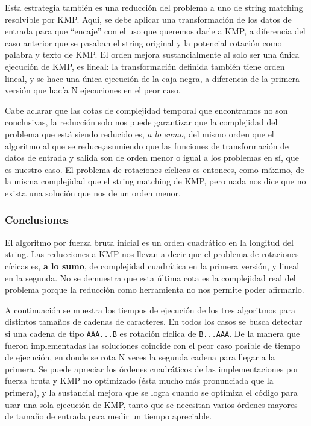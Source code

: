 \documentclass{article}
\begin{document}
Esta estrategia también es una reducción del problema a uno de string matching resolvible por KMP. Aquí, se debe aplicar una transformación de los datos de entrada para que ``encaje'' con el uso que queremos darle a KMP, a diferencia del caso anterior que se pasaban el string original y la potencial rotación como palabra y texto de KMP. El orden mejora sustancialmente al solo ser una única ejecución de KMP, es lineal: la transformación definida también tiene orden lineal, y se hace una única ejecución de la caja negra, a diferencia de la primera versión que hacía N ejecuciones en el peor caso.

Cabe aclarar que las cotas de complejidad temporal que encontramos no son conclusivas, la reducción solo nos puede garantizar que la complejidad del problema que está siendo reducido es, \textit{a lo sumo}, del mismo orden que el algoritmo al que se reduce,asumiendo que las funciones de transformación de datos de entrada y salida son de orden menor o igual a los problemas en sí, que es nuestro caso. El problema de rotaciones cíclicas es entonces, como máximo, de la misma complejidad que el string matching de KMP, pero nada nos dice que no exista una solución que nos de un orden menor. 

\subsubsection{Conclusiones}
El algoritmo por fuerza bruta inicial es un orden cuadrático en la longitud del string. Las reducciones a KMP nos llevan a decir que el problema de rotaciones cícicas es, \textbf{a lo sumo}, de complejidad cuadrática en la primera versión, y lineal en la segunda. No se demuestra que esta última cota es la complejidad real del problema porque la reducción como herramienta no nos permite poder afirmarlo.

A continuación se muestra los tiempos de ejecución de los tres algoritmos para distintos tamaños de cadenas de caracteres. En todos los casos se busca detectar si una cadena de tipo \texttt{AAA...B} es rotación cíclica de \texttt{B...AAA}. De la manera que fueron implementadas las soluciones coincide con el peor caso posible de tiempo de ejecución, en donde se rota N veces la segunda cadena para llegar a la primera. Se puede apreciar los órdenes cuadráticos de las implementaciones por fuerza bruta y KMP no optimizado (ésta mucho más pronunciada que la primera), y la sustancial mejora que se logra cuando se optimiza el código para usar una sola ejecución de KMP, tanto que se necesitan varios órdenes mayores de tamaño de entrada para medir un tiempo apreciable.
\end{document}
